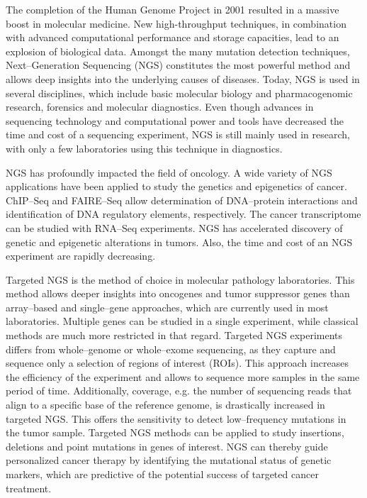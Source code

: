 {{    The completion of the Human Genome Project in 2001 resulted in a massive
    boost in molecular medicine. New high-throughput techniques, in combination
    with advanced computational performance and storage capacities, lead to an
    explosion of biological data. Amongst the many mutation detection
    techniques, Next--Generation Sequencing (NGS) constitutes the most powerful
    method and allows deep insights into the underlying causes of diseases.
    Today, NGS is used in several disciplines, which include basic molecular
    biology and pharmacogenomic research, forensics and molecular diagnostics.
    Even though advances in sequencing technology and computational power and
    tools have decreased the time and cost of a sequencing experiment, NGS is
    still mainly used in research, with only a few laboratories using this
    technique in diagnostics.

    NGS has profoundly impacted the field of oncology. A wide variety of NGS
    applications have been applied to study the genetics and epigenetics of
    cancer. ChIP--Seq and FAIRE--Seq allow determination of DNA--protein
    interactions and identification of DNA regulatory elements, respectively.
    The cancer transcriptome can be studied with RNA--Seq experiments. NGS has
    accelerated discovery of genetic and epigenetic alterations in tumors. Also,
    the time and cost of an NGS experiment are rapidly decreasing.

    Targeted NGS is the method of choice in molecular pathology laboratories.
    This method allows deeper insights into oncogenes and tumor suppressor genes
    than array--based and single--gene approaches, which are currently used in
    most laboratories. Multiple genes can be studied in a single experiment,
    while classical methods are much more restricted in that regard. Targeted
    NGS experiments differs from whole--genome or whole--exome sequencing, as
    they capture and sequence only a selection of regions of interest (ROIs).
    This approach increases the efficiency of the experiment and allows to
    sequence more samples in the same period of time. Additionally, coverage,
    e.g. the number of sequencing reads that align to a specific base of the
    reference genome, is drastically increased in targeted NGS. This offers the
    sensitivity to detect low--frequency mutations in the tumor sample.
    Targeted NGS methods can be applied to study insertions, deletions and
    point mutations in genes of interest. NGS can thereby guide personalized
    cancer therapy by identifying the mutational status of genetic markers,
    which are predictive of the potential success of targeted cancer treatment.

}}

